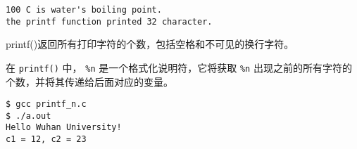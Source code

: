 \begin{frame}[fragile]
\begin{lstlisting}[backgroundcolor=\color{red!20}]
100 C is water's boiling point.
the printf function printed 32 character.
\end{lstlisting}
\end{frame}

\begin{frame}[fragile]
printf()返回所有打印字符的个数，包括空格和不可见的换行字符。
\end{frame}


\begin{frame}[fragile]
在 \lstinline|printf()| 中， \lstinline|%n| 是一个格式化说明符，它将获取 \lstinline|%n| 出现之前的所有字符的个数，并将其传递给后面对应的变量。
\end{frame}


% 


\begin{frame}[fragile]
\begin{lstlisting}[backgroundcolor=\color{red!20}]
$ gcc printf_n.c
$ ./a.out 
Hello Wuhan University!
c1 = 12, c2 = 23
\end{lstlisting}
\end{frame}



